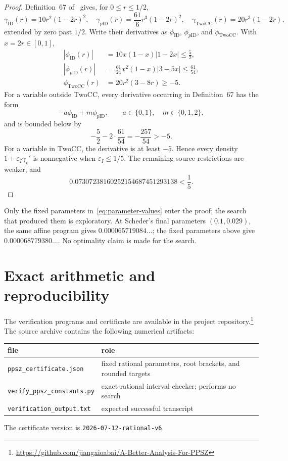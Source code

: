 \documentclass[11pt]{article}
\newcommand{\TwoCC}{\mathrm{TwoCC}}
\newcommand{\ID}{\mathrm{ID}}
\newcommand{\eps}{\varepsilon}
\begin{document}
\begin{proof}
Definition~67 of~\cite{SchederFull} gives, for $0\le r\le1/2$,
\[
 \gamma_{\ID}(r)=10r^2(1-2r)^2,
 \quad
 \gamma_{p\ID}(r)=\frac{61}{6}r^3(1-2r)^2,
 \quad
 \gamma_{\TwoCC}(r)=20r^3(1-2r),
\]
extended by zero past $1/2$.  Write their derivatives as $\phi_{\ID}$, $\phi_{p\ID}$, and $\phi_{\TwoCC}$.  With $x=2r\in[0,1]$,
\begin{align*}
 |\phi_{\ID}(r)|
 &=10x(1-x)|1-2x|\le\frac52,\\
 |\phi_{p\ID}(r)|
 &=\frac{61}{24}x^2(1-x)|3-5x|
 \le\frac{61}{54},\\
 \phi_{\TwoCC}(r)
 &=20r^2(3-8r)\ge-5.
\end{align*}
For a variable outside $\TwoCC$, every derivative occurring in Definition~67 has the form
\[
 -a\phi_{\ID}+m\phi_{p\ID},
 \qquad
 a\in\{0,1\},\quad m\in\{0,1,2\},
\]
and is bounded below by
\[
 -\frac52-2\cdot\frac{61}{54}
 =-\frac{257}{54}>-5.
\]
For a variable in $\TwoCC$, the derivative is at least $-5$.  Hence every density $1+\eps_I\gamma_v'$ is nonnegative when $\eps_I\le1/5$.  The remaining source restrictions are weaker, and
\[
 0.07307238160252154687451293138<\frac15.
\]
\end{proof}

Only the fixed parameters in~\eqref{eq:parameter-values} enter the proof; the search that produced them is exploratory.  At Scheder's final parameters $(0.1,0.029)$, the same affine program gives $0.000065719084\ldots$; the fixed parameters above give $0.000068779380\ldots$.  No optimality claim is made for the search.

\section{Exact arithmetic and reproducibility}\label{app:arithmetic}

The verification programs and certificate are available in the project repository.\footnote{\url{https://github.com/jiangxioabai/A-Better-Analysis-For-PPSZ}}
The source archive contains the following numerical artifacts:
\begin{center}
\small
\begin{tabular}{@{}ll@{}}
\toprule
file & role\\
\midrule
\texttt{ppsz\_certificate.json} & fixed rational parameters, root brackets, and rounded targets\\
\texttt{verify\_ppsz\_constants.py} & exact-rational interval checker; performs no search\\
\texttt{verification\_output.txt} & expected successful transcript\\
\bottomrule
\end{tabular}
\end{center}
The certificate version is \texttt{2026-07-12-rational-v6}.
\end{document}
